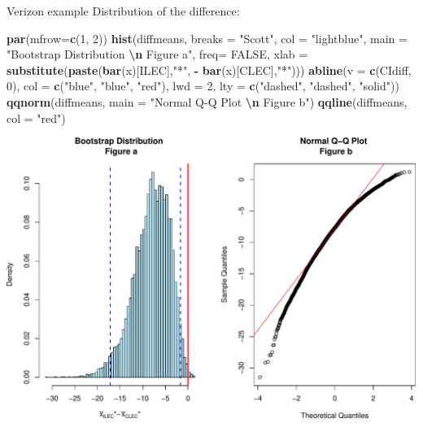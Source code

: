 \documentclass[
  ignorenonframetext,
]{beamer}
\newenvironment{Shaded}{\begin{snugshade}}{\end{snugshade}}
\newcommand{\AttributeTok}[1]{\textcolor[rgb]{0.13,0.29,0.53}{#1}}
\newcommand{\ConstantTok}[1]{\textcolor[rgb]{0.56,0.35,0.01}{#1}}
\newcommand{\DecValTok}[1]{\textcolor[rgb]{0.00,0.00,0.81}{#1}}
\newcommand{\FunctionTok}[1]{\textcolor[rgb]{0.13,0.29,0.53}{\textbf{#1}}}
\newcommand{\NormalTok}[1]{#1}
\newcommand{\SpecialCharTok}[1]{\textcolor[rgb]{0.81,0.36,0.00}{\textbf{#1}}}
\newcommand{\StringTok}[1]{\textcolor[rgb]{0.31,0.60,0.02}{#1}}
\begin{document}
\begin{frame}[fragile]{Verizon example}
\protect\hypertarget{verizon-example-7}{}
Distribution of the difference:

\tiny

\begin{Shaded}
\begin{Highlighting}[]
\FunctionTok{par}\NormalTok{(}\AttributeTok{mfrow=}\FunctionTok{c}\NormalTok{(}\DecValTok{1}\NormalTok{, }\DecValTok{2}\NormalTok{))}
\FunctionTok{hist}\NormalTok{(diffmeans, }\AttributeTok{breaks =} \StringTok{"Scott"}\NormalTok{, }\AttributeTok{col =} \StringTok{"lightblue"}\NormalTok{, }
     \AttributeTok{main =} \StringTok{"Bootstrap Distribution }\SpecialCharTok{\textbackslash{}n}\StringTok{ Figure a"}\NormalTok{, }
     \AttributeTok{freq=} \ConstantTok{FALSE}\NormalTok{, }\AttributeTok{xlab =} \FunctionTok{substitute}\NormalTok{(}\FunctionTok{paste}\NormalTok{(}\FunctionTok{bar}\NormalTok{(x)[ILEC],}\StringTok{"*"}\NormalTok{, }\SpecialCharTok{{-}} \FunctionTok{bar}\NormalTok{(x)[CLEC],}\StringTok{"*"}\NormalTok{)))}
\FunctionTok{abline}\NormalTok{(}\AttributeTok{v =} \FunctionTok{c}\NormalTok{(CIdiff, }\DecValTok{0}\NormalTok{), }\AttributeTok{col =} \FunctionTok{c}\NormalTok{(}\StringTok{"blue"}\NormalTok{, }\StringTok{"blue"}\NormalTok{, }\StringTok{"red"}\NormalTok{), }\AttributeTok{lwd =} \DecValTok{2}\NormalTok{, }
       \AttributeTok{lty =} \FunctionTok{c}\NormalTok{(}\StringTok{"dashed"}\NormalTok{, }\StringTok{"dashed"}\NormalTok{, }\StringTok{"solid"}\NormalTok{))}
\FunctionTok{qqnorm}\NormalTok{(diffmeans, }\AttributeTok{main =} \StringTok{"Normal Q{-}Q Plot }\SpecialCharTok{\textbackslash{}n}\StringTok{ Figure b"}\NormalTok{)}
\FunctionTok{qqline}\NormalTok{(diffmeans, }\AttributeTok{col =} \StringTok{"red"}\NormalTok{)}
\end{Highlighting}
\end{Shaded}

\begin{center}\includegraphics[width=0.6\linewidth,height=0.4\textheight]{Week10_Lect_files/figure-beamer/unnamed-chunk-40-1} \end{center}


\end{frame}
\end{document}
